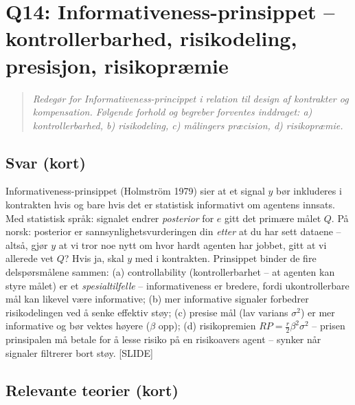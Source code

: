 \section{Q14: Informativeness-prinsippet -- kontrollerbarhed, risikodeling, presisjon, risikopræmie}\label{q:14}

\begin{quote}
\emph{Redegør for Informativeness-princippet i relation til design af kontrakter og kompensation. Følgende forhold og begreber forventes inddraget: a) kontrollerbarhed, b) risikodeling, c) målingers præcision, d) risikopræmie.}
\end{quote}

\subsection*{Svar (kort)}
Informativeness-prinsippet (Holmström 1979) sier at et signal $y$ bør inkluderes i kontrakten hvis og bare hvis det er statistisk informativt om agentens innsats. Med statistisk språk: signalet endrer \emph{posterior} for $e$ gitt det primære målet $Q$. På norsk: posterior er sannsynlighetsvurderingen din \emph{etter} at du har sett dataene -- altså, gjør $y$ at vi tror noe nytt om hvor hardt agenten har jobbet, gitt at vi allerede vet $Q$? Hvis ja, skal $y$ med i kontrakten. Prinsippet binder de fire delspørsmålene sammen: (a) controllability (kontrollerbarhet -- at agenten kan styre målet) er et \emph{spesialtilfelle} -- informativeness er bredere, fordi ukontrollerbare mål kan likevel være informative; (b) mer informative signaler forbedrer risikodelingen ved å senke effektiv støy; (c) presise mål (lav varians $\sigma^2$) er mer informative og bør vektes høyere ($\beta$ opp); (d) risikopremien $RP = \tfrac{r}{2}\beta^2\sigma^2$ -- prisen prinsipalen må betale for å lesse risiko på en risikoavers agent -- synker når signaler filtrerer bort støy. [SLIDE]

\subsection*{Relevante teorier (kort)}


